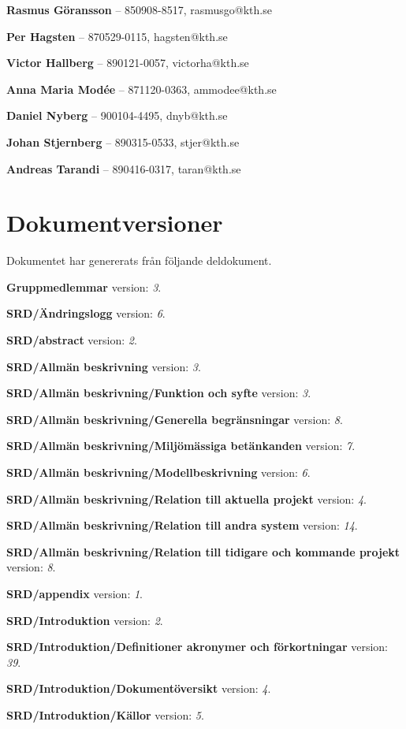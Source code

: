 \documentclass[a4paper, twoside, 11pt, titlepage]{article}
\begin{document}
\textbf{Rasmus Göransson} -- 850908-8517, rasmusgo@kth.se 

\textbf{Per Hagsten} -- 870529-0115, hagsten@kth.se

\textbf{Victor Hallberg} -- 890121-0057, victorha@kth.se

\textbf{Anna Maria Modée} -- 871120-0363, ammodee@kth.se 

\textbf{Daniel Nyberg} -- 900104-4495, dnyb@kth.se 

\textbf{Johan Stjernberg} -- 890315-0533, stjer@kth.se

\textbf{Andreas Tarandi} -- 890416-0317, taran@kth.se

\clearpage
\section*{Dokumentversioner}


Dokumentet har genererats från följande deldokument.

\textbf{Gruppmedlemmar} version: \emph{3}.

\textbf{SRD/Ändringslogg} version: \emph{6}.

\textbf{SRD/abstract} version: \emph{2}.

\textbf{SRD/Allmän beskrivning} version: \emph{3}.

\textbf{SRD/Allmän beskrivning/Funktion och syfte} version: \emph{3}.

\textbf{SRD/Allmän beskrivning/Generella begränsningar} version: \emph{8}.

\textbf{SRD/Allmän beskrivning/Miljömässiga betänkanden} version: \emph{7}.

\textbf{SRD/Allmän beskrivning/Modellbeskrivning} version: \emph{6}.

\textbf{SRD/Allmän beskrivning/Relation till aktuella projekt} version: \emph{4}.

\textbf{SRD/Allmän beskrivning/Relation till andra system} version: \emph{14}.

\textbf{SRD/Allmän beskrivning/Relation till tidigare och kommande projekt} version: \emph{8}.

\textbf{SRD/appendix} version: \emph{1}.

\textbf{SRD/Introduktion} version: \emph{2}.

\textbf{SRD/Introduktion/Definitioner akronymer och förkortningar} version: \emph{39}.

\textbf{SRD/Introduktion/Dokumentöversikt} version: \emph{4}.

\textbf{SRD/Introduktion/Källor} version: \emph{5}.
\end{document}
